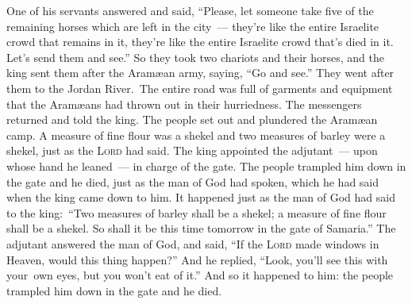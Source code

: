 \begin{inparaenum}
     One of his servants answered and said, ``Please, let someone take five of the remaining horses which are left in the city\understood{}~--- they're like the entire Israelite crowd that remains in it, they're like the entire Israelite crowd that's died in it. Let's send them and see.''%
     So they took two chariots and their horses, and the king sent them after the Aram\ae{}an army, saying, ``Go and see.''%
     They went after them to the Jordan River.\understood\ The entire road was full of garments and equipment that the Aram\ae{}ans had thrown out in their hurriedness. The messengers returned and told the king.%
     The people set out and plundered the Aram\ae{}an camp. A measure of fine flour was a shekel and two measures of barley were a shekel, just as the \textsc{Lord} had said.%
     The king appointed the adjutant~--- upon whose hand he leaned~--- in charge of the gate. The people trampled him down in the gate and he died, just as the man of God had spoken, which he had said when the king came down to him.%
     It happened just as the man of God had said to the king:\, ``Two measures of barley shall be a shekel; a measure of fine flour shall be a shekel. So shall it be this time tomorrow in the gate of Samaria.''%
     The adjutant answered the man of God, and said, ``If the \textsc{Lord} made windows in Heaven, would this thing happen?'' And he replied, ``Look, you'll see this with your\understood\ own eyes, but you won't eat of it.''%
     And so it happened to him: the people trampled him down in the gate and he died.%
\end{inparaenum}

